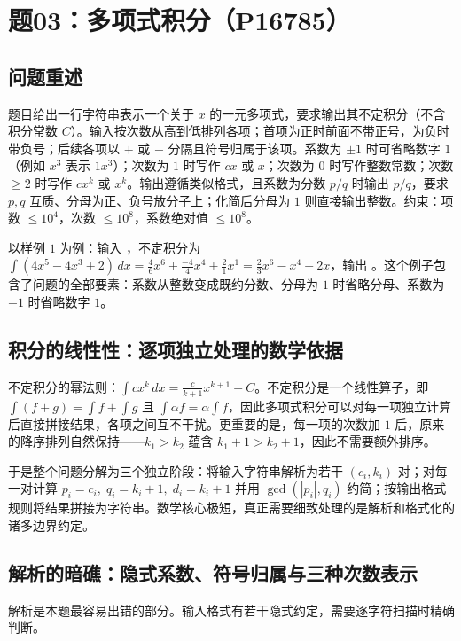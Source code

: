 \section{题03：多项式积分（P16785）}

\subsection{问题重述}

题目给出一行字符串表示一个关于 $x$ 的一元多项式，要求输出其不定积分（不含积分常数 $C$）。输入按次数从高到低排列各项；首项为正时前面不带正号，为负时带负号；后续各项以 $+$ 或 $-$ 分隔且符号归属于该项。系数为 $\pm 1$ 时可省略数字 $1$（例如 $x^3$ 表示 $1x^3$）；次数为 $1$ 时写作 $cx$ 或 $x$；次数为 $0$ 时写作整数常数；次数 $\ge 2$ 时写作 $cx^k$ 或 $x^k$。输出遵循类似格式，且系数为分数 $p/q$ 时输出 $p/q$，要求 $p,q$ 互质、分母为正、负号放分子上；化简后分母为 $1$ 则直接输出整数。约束：项数 $\le 10^4$，次数 $\le 10^8$，系数绝对值 $\le 10^8$。

以样例 $1$ 为例：输入 ，不定积分为 $\int(4x^5-4x^3+2)\,dx = \frac{4}{6}x^6 + \frac{-4}{4}x^4 + \frac{2}{1}x^1 = \frac{2}{3}x^6 - x^4 + 2x$，输出 。这个例子包含了问题的全部要素：系数从整数变成既约分数、分母为 $1$ 时省略分母、系数为 $-1$ 时省略数字 $1$。

\subsection{积分的线性性：逐项独立处理的数学依据}

不定积分的幂法则：$\int cx^k \,dx = \frac{c}{k+1}x^{k+1} + C$。不定积分是一个线性算子，即 $\int (f+g) = \int f + \int g$ 且 $\int \alpha f = \alpha \int f$，因此多项式积分可以对每一项独立计算后直接拼接结果，各项之间互不干扰。更重要的是，每一项的次数加 $1$ 后，原来的降序排列自然保持——$k_1 > k_2$ 蕴含 $k_1+1 > k_2+1$，因此不需要额外排序。

于是整个问题分解为三个独立阶段：将输入字符串解析为若干 $(c_i, k_i)$ 对；对每一对计算 $p_i = c_i,\; q_i = k_i+1,\; d_i = k_i+1$ 并用 $\gcd(|p_i|, q_i)$ 约简；按输出格式规则将结果拼接为字符串。数学核心极短，真正需要细致处理的是解析和格式化的诸多边界约定。

\subsection{解析的暗礁：隐式系数、符号归属与三种次数表示}

解析是本题最容易出错的部分。输入格式有若干隐式约定，需要逐字符扫描时精确判断。

